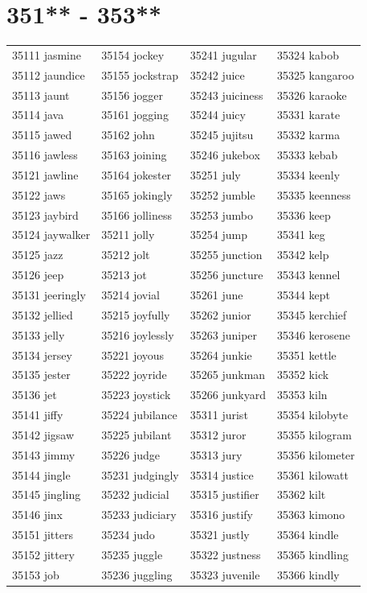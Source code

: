 \documentclass[10pt, oneside]{book}
\begin{document}
\begin{table}
	\centering
	\section*{351** - 353**}
	\begin{tabular}{l l l l}
35111 jasmine &35154 jockey &35241 jugular &35324 kabob\\
35112 jaundice &35155 jockstrap &35242 juice &35325 kangaroo\\
35113 jaunt &35156 jogger &35243 juiciness &35326 karaoke\\
35114 java &35161 jogging &35244 juicy &35331 karate\\
35115 jawed &35162 john &35245 jujitsu &35332 karma\\
35116 jawless &35163 joining &35246 jukebox &35333 kebab\\
35121 jawline &35164 jokester &35251 july &35334 keenly\\
35122 jaws &35165 jokingly &35252 jumble &35335 keenness\\
35123 jaybird &35166 jolliness &35253 jumbo &35336 keep\\
35124 jaywalker &35211 jolly &35254 jump &35341 keg\\
35125 jazz &35212 jolt &35255 junction &35342 kelp\\
35126 jeep &35213 jot &35256 juncture &35343 kennel\\
35131 jeeringly &35214 jovial &35261 june &35344 kept\\
35132 jellied &35215 joyfully &35262 junior &35345 kerchief\\
35133 jelly &35216 joylessly &35263 juniper &35346 kerosene\\
35134 jersey &35221 joyous &35264 junkie &35351 kettle\\
35135 jester &35222 joyride &35265 junkman &35352 kick\\
35136 jet &35223 joystick &35266 junkyard &35353 kiln\\
35141 jiffy &35224 jubilance &35311 jurist &35354 kilobyte\\
35142 jigsaw &35225 jubilant &35312 juror &35355 kilogram\\
35143 jimmy &35226 judge &35313 jury &35356 kilometer\\
35144 jingle &35231 judgingly &35314 justice &35361 kilowatt\\
35145 jingling &35232 judicial &35315 justifier &35362 kilt\\
35146 jinx &35233 judiciary &35316 justify &35363 kimono\\
35151 jitters &35234 judo &35321 justly &35364 kindle\\
35152 jittery &35235 juggle &35322 justness &35365 kindling\\
35153 job &35236 juggling &35323 juvenile &35366 kindly\\
	\end{tabular}
 \end{table}
\clearpage
\end{document}
